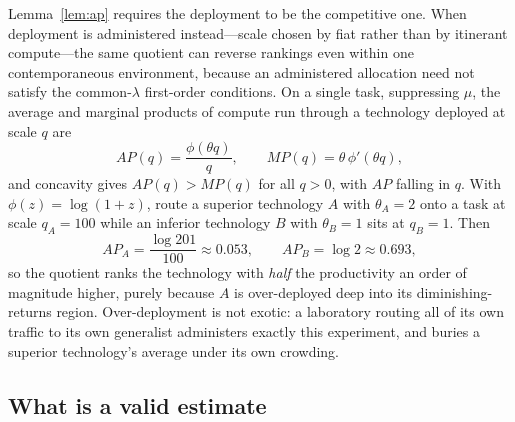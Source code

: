 \documentclass[11pt]{article}
\theoremstyle{definition}
\theoremstyle{remark}
\begin{document}
Lemma~\ref{lem:ap} requires the deployment to be the competitive one. When deployment is administered instead---scale chosen by fiat rather than by itinerant compute---the same quotient can reverse rankings even within one contemporaneous environment, because an administered allocation need not satisfy the common-$\lambda$ first-order conditions. On a single task, suppressing $\mu$, the average and marginal products of compute run through a technology deployed at scale $q$ are
\begin{equation}
AP(q) = \frac{\phi(\theta q)}{q},
\qquad
MP(q) = \theta\, \phi'(\theta q),
\end{equation}
and concavity gives $AP(q) > MP(q)$ for all $q > 0$, with $AP$ falling in $q$. With $\phi(z) = \log(1+z)$, route a superior technology $A$ with $\theta_A = 2$ onto a task at scale $q_A = 100$ while an inferior technology $B$ with $\theta_B = 1$ sits at $q_B = 1$. Then
\begin{equation}
AP_A = \frac{\log 201}{100} \approx 0.053,
\qquad
AP_B = \log 2 \approx 0.693,
\end{equation}
so the quotient ranks the technology with \emph{half} the productivity an order of magnitude higher, purely because $A$ is over-deployed deep into its diminishing-returns region. Over-deployment is not exotic: a laboratory routing all of its own traffic to its own generalist administers exactly this experiment, and buries a superior technology's average under its own crowding.

\subsection{What is a valid estimate}
\end{document}
